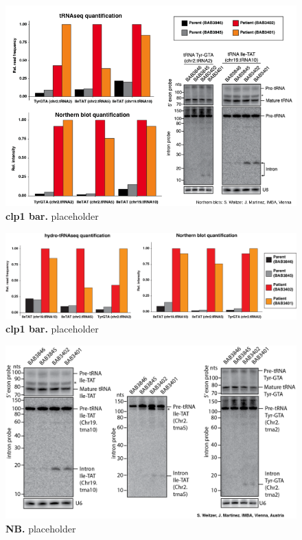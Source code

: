 \documentclass[12pt]{rockefeller}
\begin{document}
\begin{figure}[!ht]%
\centering
\includegraphics[width=\textwidth]{clp1bars.png}%
\caption[clp1 bar]
{\textbf{clp1 bar.}
placeholder}
\centering
\label{clp1bars}%
\end{figure}

\begin{figure}[!ht]%
\centering
\includegraphics[width=\textwidth]{clp1bars2.png}%
\caption[clp1 bar]
{\textbf{clp1 bar.}
placeholder}
\centering
\label{clp1bars2}%
\end{figure}

\begin{figure}[!ht]%
\centering
\includegraphics[width=\textwidth]{nb.png}%
\caption[NB]
{\textbf{NB.}
placeholder}
\centering
\label{nb}%
\end{figure}
\end{document}
